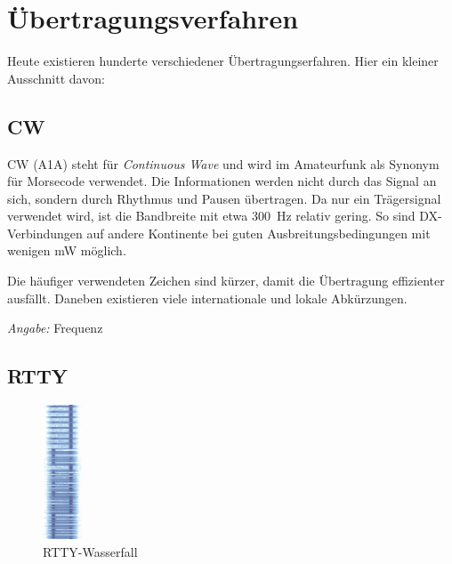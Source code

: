 \chapter{Übertragungsverfahren}\label{sec:uebertr}

Heute existieren hunderte verschiedener Übertragungserfahren. Hier ein kleiner Ausschnitt davon:

\section{CW}
CW (A1A) steht für \textit{Continuous Wave} und wird im Amateurfunk als Synonym für Morsecode verwendet. Die Informationen werden nicht durch das Signal an sich, sondern durch Rhythmus und Pausen übertragen. Da nur ein Trägersignal verwendet wird, ist die Bandbreite mit etwa 300 Hz relativ gering. So sind DX-Verbindungen auf andere Kontinente bei guten Ausbreitungsbedingungen mit wenigen mW möglich.

Die häufiger verwendeten Zeichen sind kürzer, damit die Übertragung effizienter ausfällt. Daneben existieren viele internationale und lokale Abkürzungen.

\textit{Angabe:} Frequenz

\section{RTTY}
\begin{figure}
 \centering
 \includegraphics[height=4cm]{png/RTTY-BaudlineSmall.png}
 \caption{RTTY-Wasserfall}
 \label{fig:rttyWaterfall}
\end{figure}

